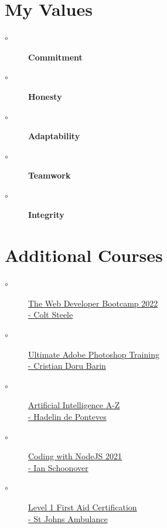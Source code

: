 \documentclass[10pt,a4paper,ragged2e,withhyper]{altacv}
\newcommand{\myhref}[2]{
		\href{#1}
		{\textcolor{ColorTwo}{#2}}
	}
\begin{document}
    \newpage
    \thispagestyle{empty}
    \begin{adjustbox}{valign=t}
    \begin{minipage}{0.3\textwidth}
       \section*{
My Values}
            \begin{description}
                \item [\normalfont \textcolor{ColorOne}{$\circ$}] \textbf{Commitment}\\
            	\item [\normalfont \textcolor{ColorOne}{$\circ$}] \textbf{Honesty}\\
                \item [\normalfont \textcolor{ColorOne}{$\circ$}] \textbf{Adaptability}\\
                \item [\normalfont \textcolor{ColorOne}{$\circ$}] \textbf{Teamwork}\\
                \item [\normalfont \textcolor{ColorOne}{$\circ$}] \textbf{Integrity}\\
            	
            \end{description}
        \section*{Additional Courses}
            \begin{description}
                \item [\normalfont \textcolor{ColorOne}{$\circ$}] \normalfont \myhref{https://www.udemy.com/course/the-web-developer-bootcamp/}{The Web Developer Bootcamp 2022 \\- Colt Steele}\\
            	\item [\normalfont \textcolor{ColorOne}{$\circ$}] \normalfont\myhref{https://www.udemy.com/course/ultimate-photoshop-training-from-beginner-to-pro/}{Ultimate Adobe Photoshop Training \\- Cristian Doru Barin}\\
                \item [\normalfont \textcolor{ColorOne}{$\circ$}] \normalfont \myhref{https://www.udemy.com/course/artificial-intelligence-az/} {Artificial Intelligence A-Z \\- Hadelin de Ponteves}\\
                \item [\normalfont \textcolor{ColorOne}{$\circ$}] \normalfont \myhref{https://www.udemy.com/course/draft/2215346/}{Coding with NodeJS 2021 \\- Ian Schoonover}\\
                \item [\normalfont \textcolor{ColorOne}{$\circ$}] \normalfont \myhref{https://stjohn.org.za/what-is-first-aid/}{Level 1 First Aid Certification\\ - St Johns Ambulance}\\
            	

\end{description}
\end{minipage}
\end{adjustbox}
\end{document}
